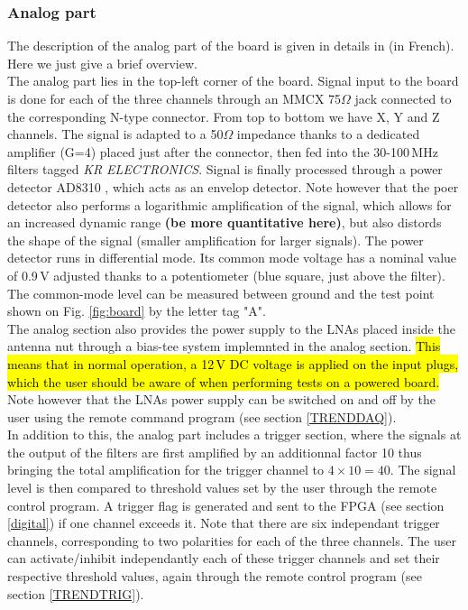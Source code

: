 \subsubsection{Analog part}
\label{analog}
The description of the analog part of the board is given in details in \cite{GP35ana} (in French). Here we just give a brief overview. \\
%
The analog part lies in the top-left corner of the board. Signal input to the board is done for each of the three channels through an MMCX 75$\Omega$ jack connected to the corresponding N-type connector. From top to bottom we have X, Y and Z channels. The signal is adapted to a 50$\Omega$ impedance thanks to a dedicated amplifier (G=4) placed just after the connector, then fed into the 30-100\,MHz filters tagged {\it KR ELECTRONICS}. Signal is finally processed through a power detector AD8310 \cite{AD8310}, which acts as an envelop detector. Note however that the poer detector also performs a logarithmic amplification of the signal, which allows for an increased dynamic range {\bf (be more quantitative here)}, but also distords the shape of the signal (smaller amplification for larger signals). The power detector runs in differential mode. Its common mode voltage has a nominal value of 0.9\,V adjusted thanks to a potentiometer (blue square, just above the filter). The common-mode level can be measured between ground and the test point shown on Fig. \ref{fig:board} by the letter tag "A". \\
%
The analog section also provides the power supply to the LNAs placed inside the antenna nut through a bias-tee system implemnted in the analog section. \hl{This means that in normal operation, a 12\,V DC voltage is applied on the input plugs, which the user should be aware of when performing tests on a powered board.} Note however that the LNAs power supply can be switched on and off by the user using the remote command program (see section \ref{TRENDDAQ}).  \\
%
In addition to this, the analog part includes a trigger section, where the signals at the output of the filters are first amplified by an additionnal factor 10 thus bringing the total amplification for the trigger channel to $4 \times 10 = 40$. The signal level is then compared to threshold values set by the user through the remote control program. A trigger flag is generated and sent to the FPGA (see section \ref{digital}) if one channel exceeds it. Note that there are six independant trigger channels, corresponding to two polarities for each of the three channels. The user can activate/inhibit independantly each of these trigger channels and set their respective threshold values, again through the remote control program (see section \ref{TRENDTRIG}). \\
